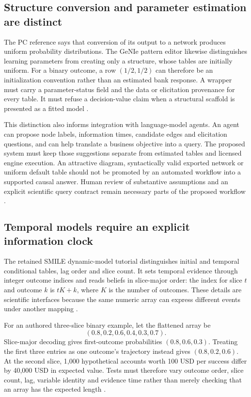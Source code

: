 \subsection{Structure conversion and parameter estimation are distinct}
The PC reference says that conversion of its output to a network produces
uniform probability distributions. The GeNIe pattern editor likewise
distinguishes learning parameters from creating only a structure, whose
tables are initially uniform. For a binary outcome, a row $(1/2,1/2)$ can
therefore be an initialization convention rather than an estimated bank
response. A wrapper must carry a parameter-status field and the data or
elicitation provenance for every table. It must refuse a decision-value
claim when a structural scaffold is presented as a fitted model
\cite{exec13_smile_pc,exec13_genie_pattern,exec24_smile_choice}.

This distinction also informs integration with language-model agents.
An agent can propose node labels, information times, candidate edges and
elicitation questions, and can help translate a business objective into a
query. The proposed system must keep those suggestions separate from
estimated tables and licensed engine execution. An attractive diagram,
syntactically valid exported network or uniform default table should not
be promoted by an automated workflow into a supported causal answer.
Human review of substantive assumptions and an explicit scientific query
contract remain necessary parts of the proposed workflow
\cite{exec24_smile_choice}.

\subsection{Temporal models require an explicit information clock}
The retained SMILE dynamic-model tutorial distinguishes initial and temporal
conditional tables, lag order and slice count. It sets temporal evidence
through integer outcome indices and reads beliefs in slice-major order:
the index for slice $t$ and outcome $k$ is $tK+k$, where $K$ is the number
of outcomes. These details are scientific interfaces because the same
numeric array can express different events under another mapping
\cite{exec13_ct_smile_tutorial}.

For an authored three-slice binary example, let the flattened array be
\[
 (0.8,0.2,0.6,0.4,0.3,0.7).
\]
Slice-major decoding gives first-outcome
probabilities $(0.8,0.6,0.3)$. Treating the first three entries as one
outcome's trajectory instead gives $(0.8,0.2,0.6)$. At the second slice,
1,000 hypothetical accounts worth 100 USD per success differ by
40,000 USD in expected value. Tests must therefore vary outcome order,
slice count, lag, variable identity and evidence time rather than merely
checking that an array has the expected length \cite{exec24_smile_choice}.


